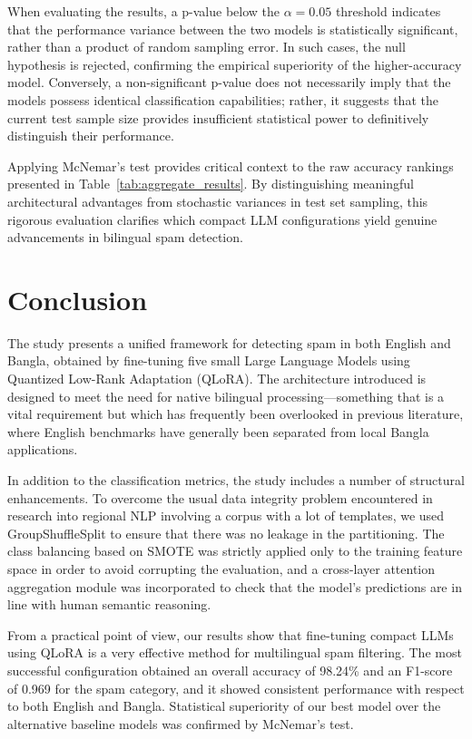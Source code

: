 \documentclass[journal]{IEEEtran}
\begin{document}
When evaluating the results, a p-value below the $\alpha = 0.05$ threshold indicates that the performance variance between the two models is statistically significant, rather than a product of random sampling error. In such cases, the null hypothesis is rejected, confirming the empirical superiority of the higher-accuracy model. Conversely, a non-significant p-value does not necessarily imply that the models possess identical classification capabilities; rather, it suggests that the current test sample size provides insufficient statistical power to definitively distinguish their performance.

Applying McNemar's test provides critical context to the raw accuracy rankings presented in Table~\ref{tab:aggregate_results}. By distinguishing meaningful architectural advantages from stochastic variances in test set sampling, this rigorous evaluation clarifies which compact LLM configurations yield genuine advancements in bilingual spam detection.

\balance
\section{Conclusion}

The study presents a unified framework for detecting spam in both English and Bangla, obtained by fine-tuning five small Large Language Models using Quantized Low-Rank Adaptation (QLoRA). The architecture introduced is designed to meet the need for native bilingual processing—something that is a vital requirement but which has frequently been overlooked in previous literature, where English benchmarks have generally been separated from local Bangla applications.

In addition to the classification metrics, the study includes a number of structural enhancements. To overcome the usual data integrity problem encountered in research into regional NLP involving a corpus with a lot of templates, we used GroupShuffleSplit to ensure that there was no leakage in the partitioning. The class balancing based on SMOTE was strictly applied only to the training feature space in order to avoid corrupting the evaluation, and a cross-layer attention aggregation module was incorporated to check that the model's predictions are in line with human semantic reasoning.

From a practical point of view, our results show that fine-tuning compact LLMs using QLoRA is a very effective method for multilingual spam filtering. The most successful configuration obtained an overall accuracy of 98.24\% and an F1-score of 0.969 for the spam category, and it showed consistent performance with respect to both English and Bangla. Statistical superiority of our best model over the alternative baseline models was confirmed by McNemar's test.
\end{document}
